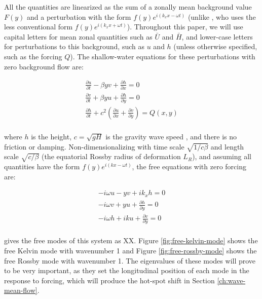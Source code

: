 All the quantities are linearized as the sum of a zonally mean background value $F(y)$  and a perturbation with the form  $f(y) e^{i( k_{x} x-\omega t)}$ (unlike \citet{matsuno1966quasi}, who uses the less conventional form  $f(y) e^{i( k_{x} x+\omega t)}$). Throughout this paper, we will use capital letters for mean zonal quantities such as $\bar{U}$ and $\bar{H}$, and lower-case letters for perturbations to this background, such as $u$ and $h$ (unless otherwise specified, such as the forcing $Q$). The shallow-water equations for these perturbations with zero background flow are:

\begin{equation}\label{eqn:sw-eqns-1}
  \begin{gathered}
     \frac{\partial u}{\partial t} - \beta y v +\frac{\partial h}{\partial x} = 0 \\
      \frac{\partial v}{\partial t} + \beta y u + \frac{\partial h}{\partial y} = 0 \\
    \frac{\partial h}{\partial t} +c^{2}(\frac{\partial u}{\partial x} + \frac{\partial v}{\partial y}) = Q(x,y) \\
  \end{gathered}
\end{equation}

where $h$ is the height, $c = \sqrt{gH}$ is the gravity wave speed \citep{matsuno1966quasi}, and there is no friction or damping. Non-dimensionalizing with time scale $\sqrt{1/c \beta}$ and length scale $\sqrt{c/\beta}$ (the equatorial Rossby radius of deformation $L_{R}$), and assuming all quantities have the form $f(y) e^{i( k x-\omega t)}$, the free equations with zero forcing are:

\begin{equation}\label{eqn:sw-eqns-2}
  \begin{gathered}
      - i \omega u - y v + i k_{x} h = 0 \\
      - i \omega v + y u + \frac{\partial h}{\partial y} = 0 \\
      - i \omega h + i k u + \frac{\partial v}{\partial y} = 0 \\
  \end{gathered}
\end{equation}

\citet{matsuno1966quasi} gives the free modes of this system as XX. Figure \ref{fig:free-kelvin-mode} shows the free Kelvin mode with wavenumber 1 and Figure \ref{fig:free-rossby-mode} shows the free Rossby mode with wavenumber 1. The eigenvalues of these modes will prove to be very important, as they set the longitudinal position of each mode in the response to forcing, which will produce the hot-spot shift in Section \ref{ch:wave-mean-flow}.

